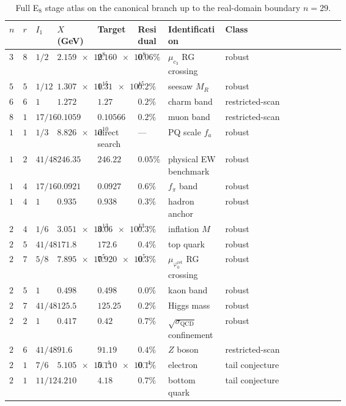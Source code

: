 \documentclass[11pt,a4paper]{article}
\theoremstyle{definition}
\theoremstyle{remark}
\newcommand{\cthree}{c_3}
\newcommand{\phiz}{\varphi_0^{\mathrm{ret}}}
\newcommand{\sigmaQCD}{\sigma_{\mathrm{QCD}}}
\begin{document}
\begin{table}[H]
\centering
\scriptsize
\setlength{\tabcolsep}{2pt}
\begin{tabularx}{\linewidth}{@{}>{\centering\arraybackslash}p{0.035\linewidth}>{\centering\arraybackslash}p{0.035\linewidth}>{\raggedright\arraybackslash}p{0.065\linewidth}>{\raggedleft\arraybackslash}p{0.12\linewidth}>{\raggedleft\arraybackslash}p{0.12\linewidth}>{\raggedright\arraybackslash}p{0.09\linewidth}>{\raggedright\arraybackslash}p{0.17\linewidth}Y@{}}
\toprule
$n$ & $r$ & $I_1$ & $X$ (GeV) & Target & Residual & Identification & Class \\
\midrule
$3$ & $8$ & $1/2$ & $\num{2.159e8}$ & $\num{2.160e8}$ & $0.06\%$ & $\mu_{\cthree}$ RG crossing & robust \\
$5$ & $5$ & $1/12$ & $\num{1.307e15}$ & $\num{1.31e15}$ & $0.2\%$ & seesaw $M_R$ & robust \\
$6$ & $6$ & $1$ & $\num{1.272}$ & $\num{1.27}$ & $0.2\%$ & charm band & restricted-scan \\
$8$ & $1$ & $17/16$ & $\num{0.1059}$ & $\num{0.10566}$ & $0.2\%$ & muon band & restricted-scan \\
$10$ & $1$ & $1/3$ & $\num{8.826e10}$ & direct search & --- & PQ scale $f_a$ & robust \\
$12$ & $2$ & $41/48$ & $\num{246.35}$ & $\num{246.22}$ & $0.05\%$ & physical EW benchmark & robust \\
$14$ & $4$ & $17/16$ & $\num{0.0921}$ & $\num{0.0927}$ & $0.6\%$ & $f_\pi$ band & robust \\
$15$ & $4$ & $1$ & $\num{0.935}$ & $\num{0.938}$ & $0.3\%$ & hadron anchor & robust \\
$21$ & $4$ & $1/6$ & $\num{3.051e13}$ & $\num{3.06e13}$ & $0.3\%$ & inflation $M$ & robust \\
$21$ & $5$ & $41/48$ & $\num{171.8}$ & $\num{172.6}$ & $0.4\%$ & top quark & robust \\
$24$ & $7$ & $5/8$ & $\num{7.895e5}$ & $\num{7.920e5}$ & $0.3\%$ & $\mu_{\phiz}$ RG crossing & robust \\
$25$ & $5$ & $1$ & $\num{0.498}$ & $\num{0.498}$ & $0.0\%$ & kaon band & robust \\
$25$ & $7$ & $41/48$ & $\num{125.5}$ & $\num{125.25}$ & $0.2\%$ & Higgs mass & robust \\
$26$ & $2$ & $1$ & $\num{0.417}$ & $\num{0.42}$ & $0.7\%$ & $\sqrt{\sigmaQCD}$ confinement & robust \\
$27$ & $6$ & $41/48$ & $\num{91.6}$ & $\num{91.19}$ & $0.4\%$ & $Z$ boson & restricted-scan \\
$28$ & $1$ & $7/6$ & $\num{5.105e-4}$ & $\num{5.110e-4}$ & $0.1\%$ & electron & tail conjecture \\
$29$ & $1$ & $11/12$ & $\num{4.210}$ & $\num{4.18}$ & $0.7\%$ & bottom quark & tail conjecture \\
\bottomrule
\end{tabularx}
\caption{Full E$_8$ stage atlas on the canonical branch up to the real-domain boundary $n=29$.}
\label{tab:e8-full-atlas}
\end{table}
\end{document}
